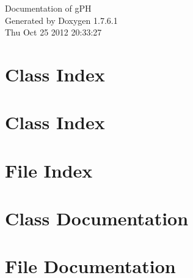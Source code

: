 \documentclass[a4paper]{book}
\begin{document}
\hypersetup{pageanchor=false,citecolor=blue}
\begin{titlepage}
\vspace*{7cm}
\begin{center}
{\Large \-Documentation of g\-P\-H }\\
\vspace*{1cm}
{\large \-Generated by Doxygen 1.7.6.1}\\
\vspace*{0.5cm}
{\small Thu Oct 25 2012 20:33:27}\\
\end{center}
\end{titlepage}
\clearemptydoublepage
{}
\tableofcontents
\clearemptydoublepage
{}
\hypersetup{pageanchor=true,citecolor=blue}
\chapter{\-Class \-Index}

\chapter{\-Class \-Index}

\chapter{\-File \-Index}

\chapter{\-Class \-Documentation}






























\chapter{\-File \-Documentation}


















\printindex
\end{document}
